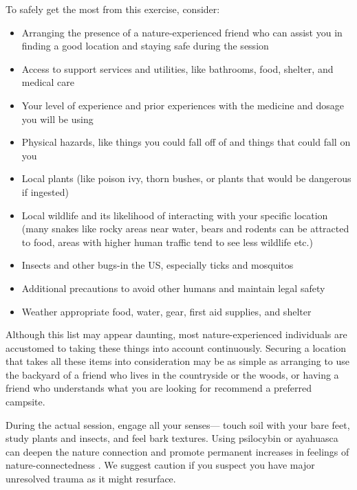 \documentclass[12pt,letterpaper]{article}
\begin{document}
To safely get the most from this exercise, consider:
\begin{itemize}
    \item Arranging the presence of a nature-experienced friend who can assist you in finding a good location and staying safe during the session
    \item Access to support services and utilities, like bathrooms, food, shelter, and medical care
    \item Your level of experience and prior experiences with the medicine and dosage you will be using
    \item Physical hazards, like things you could fall off of and things that could fall on you
    \item Local plants (like poison ivy, thorn bushes, or plants that would be dangerous if ingested)
    \item Local wildlife and its likelihood of interacting with your specific location (many snakes like rocky areas near water, bears and rodents can be attracted to food, areas with higher human traffic tend to see less wildlife etc.)
    \item Insects and other bugs-in the US, especially ticks and mosquitos
    \item Additional precautions to avoid other humans and maintain legal safety
    \item Weather appropriate food, water, gear, first aid supplies, and shelter
\end{itemize}

Although this list may appear daunting, most nature-experienced individuals are accustomed to taking these things into account continuously. Securing a location that takes all these items into consideration may be as simple as arranging to use the backyard of a friend who lives in the countryside or the woods, or having a friend who understands what you are looking for recommend a preferred campsite.

During the actual session, engage all your senses— touch soil with your bare feet, study plants and insects, and feel bark textures. Using psilocybin or ayahuasca can deepen the nature connection and promote permanent increases in feelings of nature-connectedness \cite{forstmannPsilocybinNature}. We suggest caution if you suspect you have major unresolved trauma as it might resurface.
\end{document}
